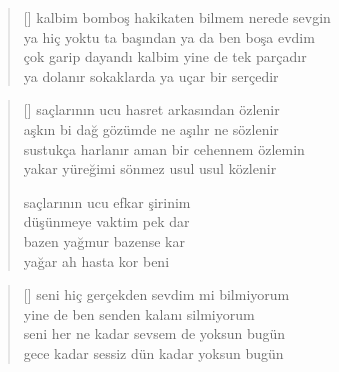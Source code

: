 \documentclass[10pt, openright, twoside]{memoir}
\theoremstyle{definition}
\begin{document}
\vspace*{\fill}
%
\newpage
{}
\vspace*{\fill}
\settowidth{\versewidth}{ya hiç yoktu ta başından ya da ben boşa evdim}
\begin{verse}[\versewidth]
  kalbim bomboş hakikaten bilmem nerede sevgin \\
  ya hiç yoktu ta başından ya da ben boşa evdim \\
  çok garip dayandı kalbim yine de tek parçadır \\
  ya dolanır sokaklarda ya uçar bir serçedir \\
\end{verse}
\vspace*{\fill}
%
\newpage
{}
\vspace*{\fill}
\settowidth{\versewidth}{sustukça harlanır aman bir cehennem özlemin}
\begin{verse}[\versewidth]
  saçlarının ucu hasret arkasından özlenir \\
  aşkın bi dağ gözümde ne aşılır ne sözlenir \\
  sustukça harlanır aman bir cehennem özlemin \\
  yakar yüreğimi sönmez usul usul közlenir

  saçlarının ucu efkar şirinim \\
  düşünmeye vaktim pek dar \\
  bazen yağmur bazense kar \\
  yağar ah hasta kor beni \\
\end{verse}
\vspace*{\fill}
%
\newpage
{}
\vspace*{\fill}
\settowidth{\versewidth}{seni her ne kadar sevsem de yoksun bugün}
\begin{verse}[\versewidth]
  seni hiç gerçekden sevdim mi bilmiyorum \\
  yine de ben senden kalanı silmiyorum \\
  seni her ne kadar sevsem de yoksun bugün \\
  gece kadar sessiz dün kadar yoksun bugün \\
\end{verse}
\vspace*{\fill}
%
\newpage
{}
\vspace*{\fill}
\end{document}
